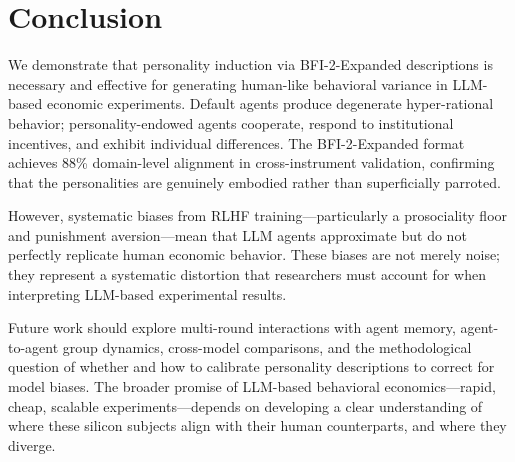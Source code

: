 \documentclass[12pt, a4paper]{article}
\begin{document}
\section{Conclusion}

We demonstrate that personality induction via BFI-2-Expanded descriptions is necessary and effective for generating human-like behavioral variance in LLM-based economic experiments. Default agents produce degenerate hyper-rational behavior; personality-endowed agents cooperate, respond to institutional incentives, and exhibit individual differences. The BFI-2-Expanded format achieves 88\% domain-level alignment in cross-instrument validation, confirming that the personalities are genuinely embodied rather than superficially parroted.

However, systematic biases from RLHF training---particularly a prosociality floor and punishment aversion---mean that LLM agents approximate but do not perfectly replicate human economic behavior. These biases are not merely noise; they represent a systematic distortion that researchers must account for when interpreting LLM-based experimental results.

Future work should explore multi-round interactions with agent memory, agent-to-agent group dynamics, cross-model comparisons, and the methodological question of whether and how to calibrate personality descriptions to correct for model biases. The broader promise of LLM-based behavioral economics---rapid, cheap, scalable experiments---depends on developing a clear understanding of where these silicon subjects align with their human counterparts, and where they diverge.
\end{document}

